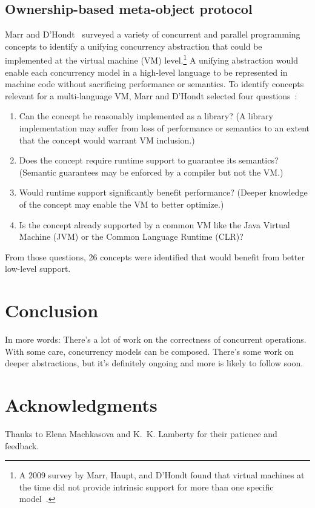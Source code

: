 \documentclass{sig-alternate}
\begin{document}
\subsection{Ownership-based meta-object protocol}

Marr and D'Hondt~\cite{Marr2012} surveyed a variety of concurrent and parallel programming concepts to identify a unifying concurrency abstraction that could be implemented at the virtual machine (VM) level.\footnote{A 2009 survey by Marr, Haupt, and D'Hondt found that virtual machines at the time did not provide intrinsic support for more than one specific model~\cite{Marr2009}.} A unifying abstraction would enable each concurrency model in a high-level language to be represented in machine code without sacrificing performance or semantics. To identify concepts relevant for a multi-language VM, Marr and D'Hondt selected four questions~\cite{Marr2012}:

\begin{enumerate}
  \item Can the concept be reasonably implemented as a library? (A library implementation may suffer from loss of performance or semantics to an extent that the concept would warrant VM inclusion.)

  \item Does the concept require runtime support to guarantee its semantics? (Semantic guarantees may be enforced by a compiler but not the VM.)

  \item Would runtime support significantly benefit performance? (Deeper knowledge of the concept may enable the VM to better optimize.)

  \item Is the concept already supported by a common VM like the Java Virtual Machine (JVM) or the Common Language Runtime (CLR)?
\end{enumerate}

From those questions, 26 concepts were identified that would benefit from better low-level support.

\section{Conclusion}

In more words: There's a lot of work on the correctness of concurrent operations. With some care, concurrency models can be composed. There's some work on deeper abstractions, but it's definitely ongoing and more is likely to follow soon.

\section*{Acknowledgments}

Thanks to Elena Machkasova and K.~K. Lamberty for their patience and feedback.

\printbibliography{}
\end{document}
